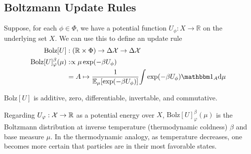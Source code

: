 \documentclass{article}
\begin{document}
\subsection{Boltzmann Update Rules}
%
%
\def\Bolz#1{\mathrm{Bolz}[#1]}
Suppose, for each $\phi \in \Phi$, we have a potential function $U_\phi : X \to \mathbb R$ on the underlying set $X$.
We can use this to define an update rule
\begin{align*}
    \Bolz U &: (\mathbb R \times \Phi) \to \Delta\X \to \Delta\X \\
    \Bolz U^\beta_\varphi(\mu)
        &:\propto
            \mu \exp(-\beta U_\phi) \\
        &= A \mapsto \frac
            1{\Ex_{\mu} [ \exp(-\beta U_\phi)]}
            {\int \exp(-\beta U_\phi) \mathbbm 1_A \mathrm d\mu }
\end{align*}

\begin{prop}
    $\Bolz U$ is additive, zero, differentiable, invertable, and commutative.
\end{prop}


\begin{remark}
    Regarding $U_\varphi : \mathcal X \to \mathbb R$ as a potential energy over $X$,
    $\Bolz U^\beta_\varphi(\mu)$ is the Boltzmann distribution at inverse temperature (thermodynamic coldness) $\beta$ and base measure $\mu$.
    In the thermodynamic analogy, as temperature decreases, one becomes more certain that particles are in their most favorable states.
\end{remark}
\end{document}
